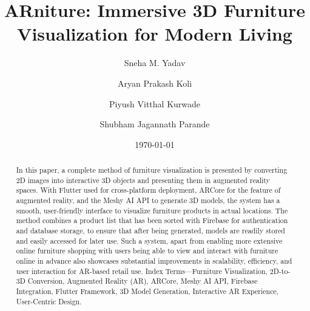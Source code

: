 \documentclass[12pt, a4paper]{article}
\title{ARniture: Immersive 3D Furniture Visualization for Modern Living}
\author{Sneha M. Yadav \and Aryan Prakash Koli \and Piyush Vitthal Kurwade \and Shubham Jagannath Parande}
\date{\today}
\begin{document}
\maketitle

\begin{abstract}
In this paper, a complete method of furniture visualization is presented by converting 2D images into interactive 3D objects and presenting them in augmented reality spaces. With Flutter used for cross-platform deployment, ARCore for the feature of augmented reality, and the Meshy AI API to generate 3D models, the system has a smooth, user-friendly interface to visualize furniture products in actual locations. The method combines a product list that has been sorted with Firebase for authentication and database storage, to ensure that after being generated, models are readily stored and easily accessed for later use. Such a system, apart from enabling more extensive online furniture shopping with users being able to view and interact with furniture online in advance also showcases substantial improvements in scalability, efficiency, and user interaction for AR-based retail use. Index Terms---Furniture Visualization, 2D-to-3D Conversion, Augmented Reality (AR), ARCore, Meshy AI API, Firebase Integration, Flutter Framework, 3D Model Generation, Interactive AR Experience, User-Centric Design.
\end{abstract}
\end{document}
